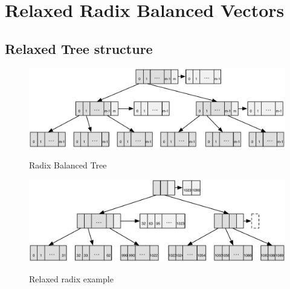 
\section{Relaxed Radix Balanced Vectors}


\subsection{Relaxed Tree structure}

\begin{figure}[h!]
  \centering
  \includegraphics[width=\textwidth]{Figures/Relaxed_Radix_balanced}
  \label{Relaxed_Radix_balanced}
  \caption{Radix Balanced Tree}
\end{figure}

\begin{figure}[h!]
  \centering
  \includegraphics[width=\textwidth]{Figures/Relaxed_radix_example}
  \label{Relaxed_radix_example}
  \caption{Relaxed radix example}
\end{figure}

